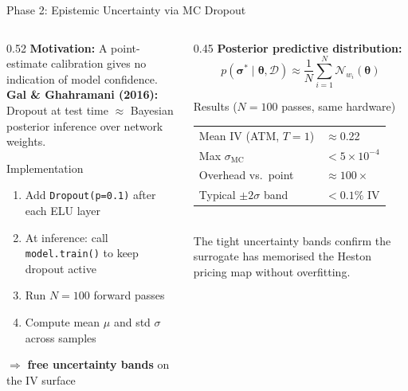 \documentclass[aspectratio=169, 10pt]{beamer}
\begin{document}
\begin{frame}{Phase 2: Epistemic Uncertainty via MC Dropout}
  \begin{columns}[T]
    \begin{column}{0.52\textwidth}
      \textbf{Motivation:} A point-estimate calibration gives no
      indication of model confidence.\\[0.5em]

      \textbf{Gal \& Ghahramani (2016):}\\
      Dropout at test time $\approx$ Bayesian posterior inference
      over network weights.\\[0.5em]

      \begin{block}{Implementation}
        \small
        \begin{enumerate}
          \item Add \texttt{Dropout(p=0.1)} after each ELU layer
          \item At inference: call \texttt{model.train()} to keep dropout active
          \item Run $N=100$ forward passes
          \item Compute mean $\mu$ and std $\sigma$ across samples
        \end{enumerate}
        $\Rightarrow$ \textbf{free uncertainty bands} on the IV surface
      \end{block}
    \end{column}

    \begin{column}{0.45\textwidth}
      \textbf{Posterior predictive distribution:}
      \[
        p(\boldsymbol\sigma^*\mid\boldsymbol\theta,\mathcal{D})
        \approx \frac{1}{N}\sum_{i=1}^{N}\mathcal{N}_{w_i}(\boldsymbol\theta)
      \]
      \vspace{0.3em}
      \begin{block}{Results ($N=100$ passes, same hardware)}
        \small
        \begin{tabular}{@{}ll@{}}
          Mean IV (ATM, $T=1$) & $\approx$0.22 \\
          Max $\sigma_{\text{MC}}$ & $<5\times10^{-4}$ \\
          Overhead vs.~point & $\approx100\times$ \\
          Typical $\pm 2\sigma$ band & $<0.1\%$ IV \\
        \end{tabular}\\[0.4em]
        \small The tight uncertainty bands confirm the surrogate has
        memorised the Heston pricing map without overfitting.
      \end{block}
    \end{column}
  \end{columns}
\end{frame}
\end{document}
